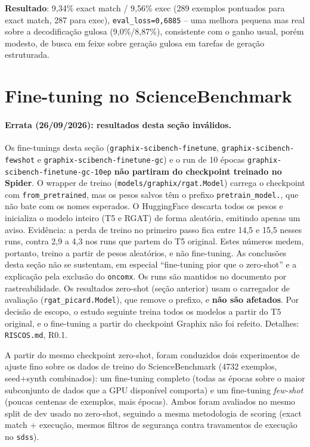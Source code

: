 \textbf{Resultado}: 9,34\% exact match / 9,56\% exec (289 exemplos
pontuados para exact match, 287 para exec), \texttt{eval\_loss=0,6885} --
uma melhora pequena mas real sobre a decodificação gulosa (9,0\%/8,87\%),
consistente com o ganho usual, porém modesto, de busca em feixe sobre
geração gulosa em tarefas de geração estruturada.

\section{Fine-tuning no ScienceBenchmark}
\label{sec:finetuning}


\paragraph{Errata (26/09/2026): resultados desta seção inválidos.}
Os fine-tunings desta seção (\texttt{graphix-scibench-finetune},
\texttt{graphix-scibench-fewshot} e \texttt{graphix-scibench-finetune-gc}) e
o run de 10 épocas \texttt{graphix-scibench-finetune-gc-10ep}
\textbf{não partiram do checkpoint treinado no Spider}. O wrapper de treino
(\texttt{models/graphix/rgat.Model}) carrega o checkpoint com
\texttt{from\_pretrained}, mas os pesos salvos têm o prefixo
\texttt{pretrain\_model.}, que não bate com os nomes esperados. O HuggingFace
descarta todos os pesos e inicializa o modelo inteiro (T5 e RGAT) de forma
aleatória, emitindo apenas um aviso. Evidência: a perda de treino no primeiro
passo fica entre 14,5 e 15,5 nesses runs, contra 2,9 a 4,3 nos runs que
partem do T5 original. Estes números medem, portanto, treino a partir de
pesos aleatórios, e não fine-tuning. As conclusões desta seção não se
sustentam, em especial ``fine-tuning pior que o zero-shot'' e a explicação
pela exclusão do \texttt{oncomx}. Os runs são mantidos no documento por
rastreabilidade. Os resultados zero-shot (seção anterior) usam o carregador
de avaliação (\texttt{rgat\_picard.Model}), que remove o prefixo, e
\textbf{não são afetados}. Por decisão de escopo, o estudo seguinte treina
todos os modelos a partir do T5 original, e o fine-tuning a partir do
checkpoint Graphix não foi refeito. Detalhes: \texttt{RISCOS.md}, R0.1.

A partir do mesmo checkpoint zero-shot, foram conduzidos dois experimentos de
ajuste fino sobre os dados de treino do ScienceBenchmark (4732 exemplos,
seed+synth combinados): um fine-tuning completo (todas as épocas sobre o
maior subconjunto de dados que a GPU disponível comporta) e um fine-tuning
\emph{few-shot} (poucas centenas de exemplos, mais épocas). Ambos foram
avaliados no mesmo split de dev usado no zero-shot, seguindo a mesma
metodologia de scoring (exact match + execução, mesmos filtros de
segurança contra travamentos de execução no \texttt{sdss}).

